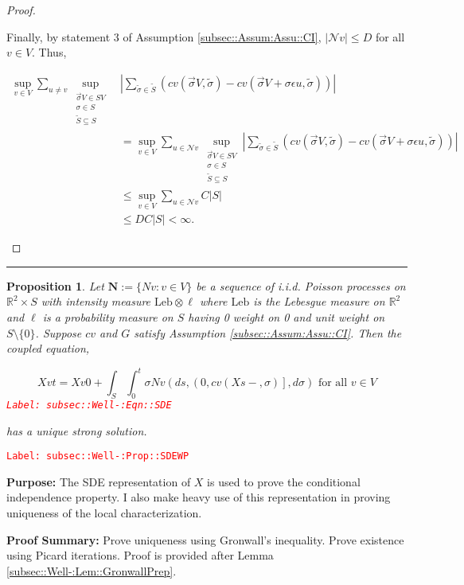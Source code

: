 \documentclass[12pt]{article}
\newcommand{\mb}{\mathbb}
\newcommand{\mc}{\mathcal}
\newcommand{\te}{\text}
\newcommand{\ep}{\epsilon}
\newcommand{\tr}{\textcolor{red}}
\newcommand{\labe}[1]{\tr{\texttt{Label: #1}}}
\newcommand{\purpose}{\textbf{Purpose: }}
\newcommand{\pfsum}{\textbf{Proof Summary: }}
\newcommand{\lin}{\rule{\linewidth}{0.4 pt}}
\newcommand{\defeq}{:=}								%
\renewcommand{\v}{v}							%
\newcommand{\vv}{u}								%
\renewcommand{\S}{S}							%
\newcommand{\s}{\sigma}							%
\newcommand{\sv}{\vec{\s}}						%
\newcommand{\ev}{\ep}							%
\renewcommand{\t}{t}							%
\renewcommand{\tt}{s}							%
\newcommand{\X}{X}								%
\newcommand{\IGr}{c}							%
\newcommand{\neigh}{\mc{N}}						%
\newcommand{\const}{C}							%
\newcommand{\degr}{D}							%
\renewcommand{\ss}{\tilde{\s}}					%
\renewcommand{\SS}{\tilde{\S}}					%
\newcommand{\poisses}{\mathbf{N}}				%
\newcommand{\poiss}{N}							%
\newcommand{\leb}{\te{Leb}}						%
\newcommand{\Sm}{\ell}							%
\newtheorem{prop}[thms]{Proposition}
\begin{document}
\begin{proof}
\begin{enumerate}[i)]
Finally, by statement 3 of Assumption \ref{subsec::Assum:Assu::CI}, \(|\neigh{\v}| \leq \degr\) for all \(\v \in V\). Thus,

\begin{align*}
\sup_{\v\in V}\sum_{\vv \neq \v} \sup_{\substack{\sv{}{V} \in \S{V}\\ \s\in \S\\ \SS\subseteq \S}}& \left|\sum_{\ss \in \SS} (\IGr{\v}(\sv{}{V},\ss) - \IGr{\v}(\sv{}{V}+\s\ev{\vv},\ss))\right|\\
&  = \sup_{\v\in V}\sum_{\vv\in \neigh{\v}} \sup_{\substack{\sv{}{V} \in \S{V}\\ \s\in \S\\ \SS\subseteq \S}} \left|\sum_{\ss \in \SS} (\IGr{\v}(\sv{}{V},\ss) - \IGr{\v}(\sv{}{V}+\s\ev{\vv},\ss))\right|\\
&\leq \sup_{\v\in V} \sum_{\vv \in \neigh{\v}} \const{}|\S|\\
&\leq \degr \const{}|\S| < \infty.
\end{align*}


\end{enumerate}
\end{proof}

\lin

\begin{prop}
Let \(\poisses \defeq \{\poiss{\v}:\v\in V\}\) be a sequence of i.i.d. Poisson processes on \(\mb{R}^2\times \S\) with intensity measure \(\leb\otimes \Sm\) where \(\leb\) is the Lebesgue measure on \(\mb{R}^2\) and \(\Sm\) is a probability measure on \(\S\) having 0 weight on 0 and unit weight on \(\S\setminus \{0\}\). Suppose \(\IGr{\v}\) and \(G\) satisfy Assumption \ref{subsec::Assum:Assu::CI}. Then the coupled equation,

\begin{equation}
\X{\v}{\t} = \X{\v}{0} + \int_\S\int_0^\t \s\poiss{\v}\left(d\tt,\left(0,\IGr{\v}(\X{}{\tt-},\s)\right],d\s\right) \te{ for all }\v \in V
\label{subsec::Well-:Eqn::SDE}
\end{equation}
\labe{subsec::Well-:Eqn::SDE}

has a unique strong solution.
\label{subsec::Well-:Prop::SDEWP}
\end{prop}
\labe{subsec::Well-:Prop::SDEWP}

\purpose The SDE representation of \(\X{}{}\) is used to prove the conditional independence property. I also make heavy use of this representation in proving uniqueness of the local characterization.

\pfsum Prove uniqueness using Gronwall's inequality. Prove existence using Picard iterations. Proof is provided after Lemma \ref{subsec::Well-:Lem::GronwallPrep}.
\end{document}
